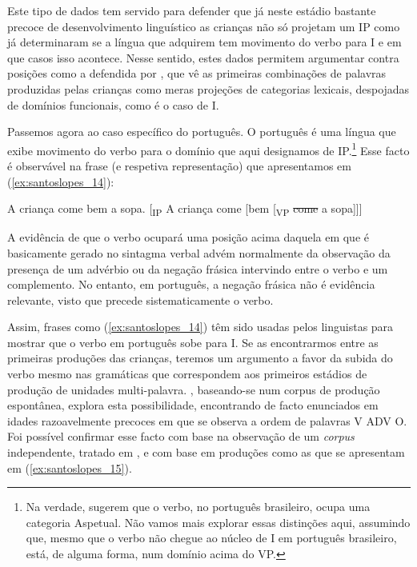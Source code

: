\documentclass[output=paper]{LSP/langsci}
\begin{document}
Este tipo de dados tem servido para defender que já neste estádio bastante precoce de desenvolvimento linguístico as crianças não só projetam um IP como já determinaram se a língua que adquirem tem movimento do verbo para I e em que casos isso acontece. Nesse sentido, estes dados permitem argumentar contra posições como a defendida por \citet{radford1988}, que vê as primeiras combinações de palavras produzidas pelas crianças como meras projeções de categorias lexicais, despojadas de domínios funcionais, como é o caso de I.

Passemos agora ao caso específico do português. O português é uma língua que exibe movimento do verbo para o domínio que aqui designamos de IP.\footnote{Na verdade, \citet{cyrino_matos2002} sugerem que o verbo, no português brasileiro, ocupa uma categoria Aspetual. Não vamos mais explorar essas distinções aqui, assumindo que, mesmo que o verbo não chegue ao núcleo de I em português brasileiro, está, de alguma forma, num domínio acima do VP.} Esse facto é observável na frase (e respetiva representação) que apresentamos em (\ref{ex:santoslopes_14}):

\ea\label{ex:santoslopes_14}
\ea\label{ex:santoslopes_14a}
A criança come bem a sopa.
\ex\label{ex:santoslopes_14b}
[\textsubscript{IP} A criança come [bem [\textsubscript{VP} \sout{come} a sopa]]]
\zl

A evidência de que o verbo ocupará uma posição acima daquela em que é basicamente gerado no sintagma verbal advém normalmente da observação da presença de um advérbio ou da negação frásica intervindo entre o verbo e um complemento. No entanto, em português, a negação frásica não é evidência relevante, visto que precede sistematicamente o verbo.
 
Assim, frases como (\ref{ex:santoslopes_14}) têm sido usadas pelos linguistas para mostrar que o verbo em português sobe para I. Se as encontrarmos entre as primeiras produções das crianças, teremos um argumento a favor da subida do verbo mesmo nas gramáticas que correspondem aos primeiros estádios de produção de unidades multi-palavra. \citet{goncalves2004,goncalves2006}, baseando-se num corpus de produção espontânea, explora esta possibilidade, encontrando de facto enunciados em idades razoavelmente precoces em que se observa a ordem de palavras V ADV O. Foi possível confirmar esse facto com base na observação de um \textit{corpus} independente, tratado em \citet{santos2006}, e com base em produções como as que se apresentam em (\ref{ex:santoslopes_15}).
  
\end{document}
